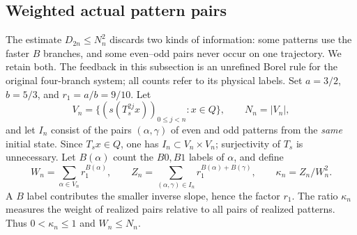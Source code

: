 \documentclass[11pt,reqno]{amsart}
\numberwithin{equation}{section}
\theoremstyle{definition}
\theoremstyle{definition}
\begin{document}
\subsection{Weighted actual pattern pairs}
The estimate $D_{2n}\le N_n^2$ discards two kinds of information:
some patterns use the faster $B$ branches, and some even--odd pairs
never occur on one trajectory. We retain both. The feedback in this
subsection is an unrefined Borel rule for the original four-branch
system; all counts refer to its physical labels.
Set $a=3/2$, $b=5/3$, and $r_1=a/b=9/10$. Let
\[
 V_n=\{(s(T_s^{2j}x))_{0\le j<n}:x\in Q\},\qquad N_n=|V_n|,
\]
and let $I_n$ consist of the pairs $(\alpha,\gamma)$ of even
and odd patterns from the \emph{same} initial state. Since
$T_sx\in Q$, one has $I_n\subset V_n\times V_n$; surjectivity
of $T_s$ is unnecessary. Let $B(\alpha)$ count the $B0,B1$
labels of $\alpha$, and define
\[
 W_n=\sum_{\alpha\in V_n}r_1^{B(\alpha)},\qquad
 Z_n=\sum_{(\alpha,\gamma)\in I_n}
            r_1^{B(\alpha)+B(\gamma)},\qquad
 \kappa_n=Z_n/W_n^2.
\]
A $B$ label contributes the smaller inverse slope, hence the factor
$r_1$. The ratio $\kappa_n$ measures the weight of realized pairs
relative to all pairs of realized patterns. Thus
$0<\kappa_n\le1$ and $W_n\le N_n$.
\end{document}

